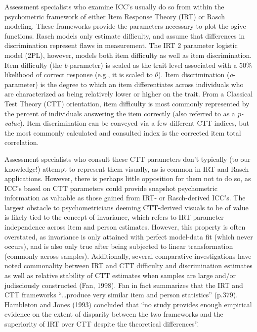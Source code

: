 \documentclass[
  man]{apa6}
\begin{document}
Assessment specialists who examine ICC's usually do so from within the psychometric framework of either Item Response Theory (IRT) or Rasch modeling. These frameworks provide the parameters necessary to plot the ogive functions. Rasch models only estimate difficulty, and assume that differences in discrimination represent flaws in measurement. The IRT 2 parameter logistic model (2PL), however, models both item difficulty as well as item discrimination. Item difficulty (the \emph{b}-parameter) is scaled as the trait level associated with a 50\% likelihood of correct response (e.g., it is scaled to \(\theta\)). Item discrimination (\emph{a}-parameter) is the degree to which an item differentiates across individuals who are characterized as being relatively lower or higher on the trait. From a Classical Test Theory (CTT) orientation, item difficulty is most commonly represented by the percent of individuals answering the item correctly (also referred to as a \emph{p-value}). Item discrimination can be conveyed via a few different CTT indices, but the most commonly calculated and consulted index is the corrected item total correlation.

Assessment specialists who consult these CTT parameters don't typically (to our knowledge!) attempt to represent them visually, as is common in IRT and Rasch applications. However, there is perhaps little opposition for them not to do so, as ICC's based on CTT parameters could provide snapshot psychometric information as valuable as those gained from IRT- or Rasch-derived ICC's. The largest obstacle to psychometricians deeming CTT-derived visuals to be of value is likely tied to the concept of invariance, which refers to IRT parameter independence across item and person estimates. However, this property is often overstated, as invariance is only attained with perfect model-data fit (which never occurs), and is also only true after being subjected to linear transformation (commonly across samples). Additionally, several comparative investigations have noted commonality between IRT and CTT difficulty and discrimination estimates as well as relative stability of CTT estimates when samples are large and/or judisciously constructed (Fan, 1998). Fan in fact summarizes that the IRT and CTT frameworks ``\ldots produce very similar item and person statistics'' (p.379). Hambleton and Jones (1993) concluded that ``no study provides enough empirical evidence on the extent of disparity between the two frameworks and the superiority of IRT over CTT despite the theoretical differences''.
\end{document}
